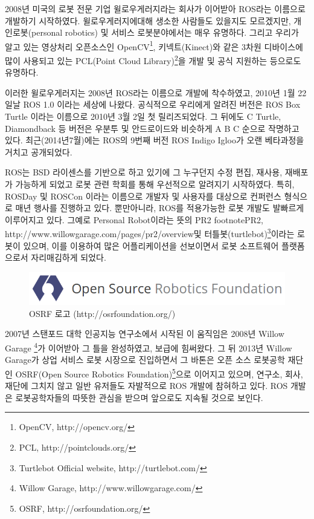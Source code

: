 2008년 미국의 로봇 전문 기업  윌로우게러지라는 회사가 이어받아 ROS라는 이름으로 개발하기 시작하였다. 윌로우게러지에대해 생소한 사람들도 있을지도 모르겠지만, 개인로봇(personal robotics) 및 서비스 로봇분야에서는 매우 유명하다. 그리고 우리가 알고 있는 영상처리 오픈소스인 OpenCV\footnote{OpenCV, http://opencv.org/}, 키넥트(Kinect)와 같은 3차원 디바이스에 많이 사용되고 있는 PCL(Point Cloud Library)\footnote{PCL, http://pointclouds.org/}을 개발 및 공식 지원하는 등으로도 유명하다. 

이러한 윌로우게러지는 2008년 ROS라는 이름으로 개발에 착수하였고, 2010년 1월 22일날 ROS 1.0 이라는 세상에 나왔다. 공식적으로 우리에게 알려진 버전은 ROS Box Turtle 이라는 이름으로 2010년 3월 2일 첫 릴리즈되었다. 그 뒤에도 C Turtle, Diamondback 등 버전은 우분투 및 안드로이드와 비슷하게 A B C 순으로 작명하고 있다. 최근(2014년7월)에는 ROS의 9번째 버전 ROS Indigo Igloo가 오랜 베타과정을 거치고 공개되었다. 

ROS는 BSD 라이센스를 기반으로 하고 있기에 그 누구던지 수정 편집, 재사용, 재배포가 가능하게 되었고 로봇 관련 학회를 통해 우선적으로 알려지기 시작하였다. 특히, ROSDay 및 ROSCon 이라는 이름으로 개발자 및 사용자를 대상으로 컨퍼런스 형식으로 매년 행사를 진행하고 있다. 뿐만아니라, ROS를 적용가능한 로봇 개발도 발빠르게 이루어지고 있다. 그예로 Personal Robot이라는 뜻의 PR2 footnote{PR2, http://www.willowgarage.com/pages/pr2/overview}및 터틀봇(turtlebot)\footnote{Turtlebot Official website, http://turtlebot.com/}이라는 로봇이 있으며, 이를 이용하여 많은 어플리케이션을 선보이면서 로봇 소프트웨어 플랫폼으로서 자리매김하게 되었다. 

\begin{figure}[h]
\centering\includegraphics[width=\columnwidth]{pictures/chapter1/osrf_logo.png}
\caption{OSRF 로고 (http://osrfoundation.org/)}
\end{figure}

2007년 스탠포드 대학 인공지능 연구소에서 시작된 이 움직임은 2008년 Willow Garage \footnote{Willow Garage, http://www.willowgarage.com/}가 이어받아 그 틀을 완성하였고, 보급에 힘써왔다. 그 뒤 2013년 Willow Garage가 상업 서비스 로봇 시장으로 진입하면서 그 바톤은 오픈 소스 로봇공학 재단인 OSRF(Open Source Robotics Foundation)\footnote{OSRF, http://osrfoundation.org/}으로 이어지고 있으며, 연구소, 회사, 재단에 그치지 않고 일반 유저들도 자발적으로 ROS 개발에 참혀하고 있다. ROS 개발은 로봇공학자들의 따뜻한 관심을 받으며 앞으로도 지속될 것으로 보인다.


